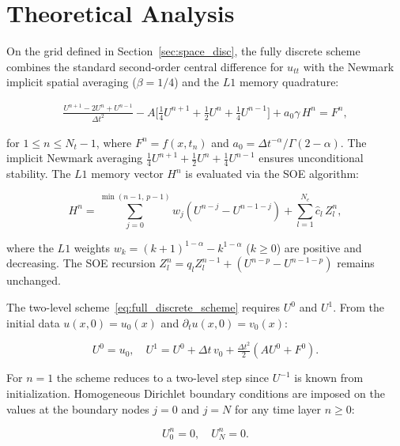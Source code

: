 \documentclass[a4paper,fleqn]{cas-sc}
\begin{document}
\section{Theoretical Analysis}\label{sec:analysis}

On the grid defined in Section~\ref{sec:space_disc}, the fully discrete scheme combines the standard second-order central difference for $u_{tt}$ with the Newmark implicit spatial averaging ($\beta=1/4$) and the $L1$ memory quadrature:
\begin{linenomath}
\begin{equation}\label{eq:full_discrete_scheme}
\begin{split}
  \frac{U^{n+1}\!-\!2U^n\!+\!U^{n-1}}{\Delta t^2} - A\bigl[\tfrac{1}{4}U^{n+1}\!+\!\tfrac{1}{2}U^n\!+\!\tfrac{1}{4}U^{n-1}\bigr] + a_0\gamma\,H^{n} = F^{n},
\end{split}
\end{equation}
\end{linenomath}
for $1 \le n \le N_t-1$, where $F^{n} = f(x, t_{n})$ and $a_0 = \Delta t^{-\alpha}/\Gamma(2-\alpha)$. The implicit Newmark averaging $\frac{1}{4}U^{n+1} + \frac{1}{2}U^n + \frac{1}{4}U^{n-1}$ ensures unconditional stability. The $L1$ memory vector $H^n$ is evaluated via the SOE algorithm:
\begin{linenomath}
\begin{equation}\label{eq:discrete_memory_soe}
  H^{n} = \sum_{j=0}^{\min(n-1,\,p-1)} w_j \left(U^{n-j} - U^{n-1-j}\right) + \sum_{l=1}^{N_e} \hat{c}_l\,Z_l^{n},
\end{equation}
\end{linenomath}
where the $L1$ weights $w_k = (k+1)^{1-\alpha}-k^{1-\alpha}$ ($k \ge 0$) are positive and decreasing. The SOE recursion $Z_l^{n} = q_l Z_l^{n-1} + (U^{n-p}-U^{n-1-p})$ remains unchanged.

The two-level scheme~\eqref{eq:full_discrete_scheme} requires $U^0$ and $U^1$. From the initial data $u(x,0)=u_0(x)$ and $\partial_t u(x,0)=v_0(x)$:
\begin{linenomath}
\begin{equation}\label{eq:full_discrete_ic}
  U^0 = u_0,\quad U^1 = U^0 + \Delta t\,v_0 + \tfrac{\Delta t^2}{2}(AU^0 + F^0).
\end{equation}
\end{linenomath}
For $n=1$ the scheme reduces to a two-level step since $U^{-1}$ is known from initialization.
Homogeneous Dirichlet boundary conditions are imposed on the values at the boundary nodes $j=0$ and $j=N$ for any time layer $n \ge 0$:
\begin{linenomath}
\begin{equation}\label{eq:full_discrete_bc}
  U_0^n = 0, \quad U_N^n = 0.
\end{equation}
\end{linenomath}
\end{document}
